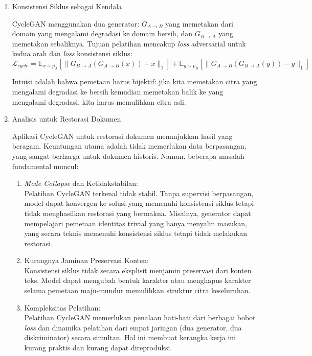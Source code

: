 \documentclass[12pt,a4paper]{article}
\begin{document}
\begin{enumerate}[leftmargin=*, labelindent=0pt, itemsep=1ex, topsep=0pt]

\item Konsistensi Siklus sebagai Kendala
\label{para:cyclegan-consistency}

CycleGAN menggunakan dua generator: $G_{A \to B}$ yang memetakan dari domain yang mengalami degradasi ke domain bersih, dan $G_{B \to A}$ yang memetakan sebaliknya. Tujuan pelatihan mencakup \textit{loss} adversarial untuk kedua arah dan \textit{loss} konsistensi siklus:
\begin{equation}
      \mathcal{L}_{cycle} = \mathbb{E}_{x \sim p_A}[\|G_{B \to A}(G_{A \to B}(x)) - x\|_1] + \mathbb{E}_{y \sim p_B}[\|G_{A \to B}(G_{B \to A}(y)) - y\|_1]
\end{equation}

Intuisi adalah bahwa pemetaan harus bijektif: jika kita memetakan citra yang mengalami degradasi ke bersih kemudian memetakan balik ke yang mengalami degradasi, kita harus memulihkan citra asli.

\item Analisis untuk Restorasi Dokumen
\label{para:cyclegan-analisis}

Aplikasi CycleGAN untuk restorasi dokumen menunjukkan hasil yang beragam. Keuntungan utama adalah tidak memerlukan data berpasangan, yang sangat berharga untuk dokumen historis. Namun, beberapa masalah fundamental muncul:

\begin{enumerate}[leftmargin=1.5em, labelsep=0.5em, itemindent=0pt, label=\alph*., topsep=0pt, parsep=0pt, itemsep=0pt]
      \item \textit{Mode Collapse} dan Ketidakstabilan: \mbox{}\\[0.1em] Pelatihan CycleGAN terkenal tidak stabil. Tanpa supervisi berpasangan, model dapat konvergen ke solusi yang memenuhi konsistensi siklus tetapi tidak menghasilkan restorasi yang bermakna. Misalnya, generator dapat mempelajari pemetaan identitas trivial yang hanya menyalin masukan, yang secara teknis memenuhi konsistensi siklus tetapi tidak melakukan restorasi.
      \item Kurangnya Jaminan Preservasi Konten: \mbox{}\\[0.1em] Konsistensi siklus tidak secara eksplisit menjamin preservasi dari konten teks. Model dapat mengubah bentuk karakter atau menghapus karakter selama pemetaan maju-mundur memulihkan struktur citra keseluruhan.
      \item Kompleksitas Pelatihan: \mbox{}\\[0.1em] Pelatihan CycleGAN memerlukan penalaan hati-hati dari berbagai bobot \textit{loss} dan dinamika pelatihan dari empat jaringan (dua generator, dua diskriminator) secara simultan. Hal ini membuat kerangka kerja ini kurang praktis dan kurang dapat direproduksi.
\end{enumerate}


\end{enumerate}
\end{document}
